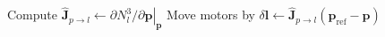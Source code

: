 \State Compute $\hat{\mathbf{J}}_{p \to l} \gets \left. \partial N_l^3 / \partial \mathbf{p} \right|_{\mathbf{p}}$
\State Move motors by $\delta\mathbf{l} \gets \hat{\mathbf{J}}_{p \to l} (\mathbf{p}_{\mathrm{ref}} - \mathbf{p})$
